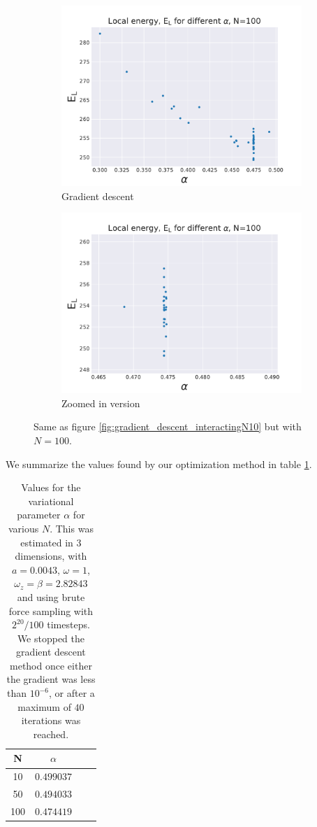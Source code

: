 \documentclass[a4paper, 10pt]{article}
\begin{document}
		\begin{figure}[ht!]
			\centering
			\centering
			\begin{subfigure}{.5\textwidth}
				\centering
				\includegraphics[width=.8\linewidth]{../Results/Finding_the_optimal_alpha/E_v_alpha_gradientN100.pdf}
				\caption{Gradient descent}
			\end{subfigure}%
			\begin{subfigure}{.5\textwidth}
				\centering
				\includegraphics[width=.8\linewidth]{../Results/Finding_the_optimal_alpha/E_v_alpha_gradientN100Zoom.pdf}
				\caption{Zoomed in version}
			\end{subfigure}
			\caption{Same as figure \ref{fig:gradient_descent_interactingN10} but with $N=100$. }\label{fig:gradient_descent_interactingN100}
		\end{figure}
		\pagebreak
		\newpage
		We summarize the values found by our optimization method in table \ref{tab:correct_alpha_interacting}.
			\begin{table}[ht!]
			\caption{Values for the variational parameter $\alpha$ for various $N$. This was estimated in 3 dimensions, with $a=0.0043$, $\omega=1$, $\omega_z=\beta=2.82843$ and using brute force sampling with $2^{20}/100$ timesteps. We stopped the gradient descent method once either the gradient was less than $10^{-6}$, or after a maximum of $40$ iterations was reached.}\label{tab:correct_alpha_interacting}
				\centering
				\begin{tabular}{cccc}
					N & $\alpha$\\
					\hline
					10 & $0.499037$\\
					50 &$0.494033$\\ 
					100 & $0.474419$
				\end{tabular}
		\end{table}
\end{document}
